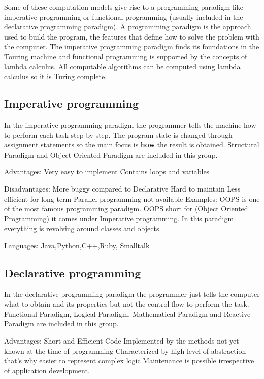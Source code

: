 Some of these computation models give rise to a programming paradigm like imperative programming or functional programming (usually included in the declarative programming paradigm).
A programming paradigm is the approach used to build the program, the features that define how to solve the problem with the computer. 
The imperative programming paradigm finds its foundations in the Touring machine and functional programming is supported by the concepts of lambda calculus. 
All computable algorithms can be computed using lambda calculus so it is Turing complete.



        \subsection*{Imperative programming}
    
In the imperative programming paradigm the programmer tells the machine how to perform each task step by step. 
The program state is changed through assignment statements so the main focus is \textbf{how} the result is obtained. 
Structural Paradigm and Object-Oriented Paradigm are included in this group. 

Advantages:
Very easy to implement
Contains loops and variables

Disadvantages:
More buggy compared to Declarative
Hard to maintain
Less efficient for long term
Parallel programming not available
Examples:
OOPS is one of the most famous programming paradigm. OOPS short for (Object Oriented Programming) it comes under Imperative programming. In 
this paradigm everything is revolving around classes and objects.

Languages: Java,Python,C++,Ruby, Smalltalk


        \subsection*{Declarative programming}

In the declarative programming paradigm the programmer just tells the computer what to obtain and its properties but not the control flow to perform the task.
Functional Paradigm, Logical Paradigm, Mathematical Paradigm and Reactive Paradigm are included in this group.
 
Advantages:
Short and Efficient Code
Implemented by the methods not yet known at the time of programming
Characterized by high level of abstraction that's why easier to represent complex logic
Maintenance is possible irrespective of application development.


